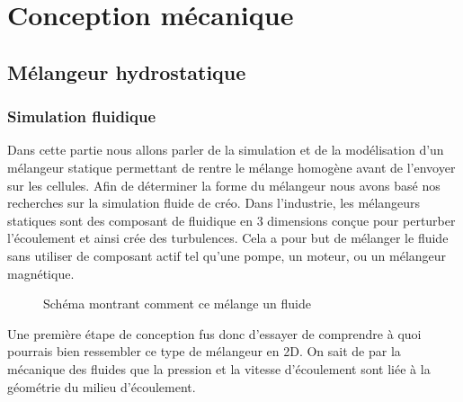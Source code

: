 \documentclass[a4paper, 11pt]{article}
\begin{document}
\newpage
\section{Conception mécanique}
\subsection{Mélangeur hydrostatique}
\subsubsection{Simulation fluidique}
Dans cette partie nous allons parler de la simulation et de la modélisation d'un mélangeur statique permettant de rentre le mélange homogène avant de l'envoyer sur les cellules.
Afin de déterminer la forme du mélangeur nous avons basé nos recherches sur la simulation fluide de créo.
Dans l'industrie, les mélangeurs statiques sont des composant de fluidique en 3 dimensions conçue pour perturber l'écoulement et ainsi crée des turbulences.
Cela a pour but de mélanger le fluide sans utiliser de composant actif tel qu'une pompe, un moteur, ou un mélangeur magnétique.
\begin{figure}[H]
    \centering
    \caption{Schéma montrant comment ce mélange un fluide}
    \label{fig:simulation1}
\end{figure}
Une première étape de conception fus donc d'essayer de comprendre à quoi pourrais bien ressembler ce type de mélangeur en 2D.
On sait de par la mécanique des fluides que la pression et la vitesse d'écoulement sont liée à la géométrie du milieu d'écoulement.
\end{document}
